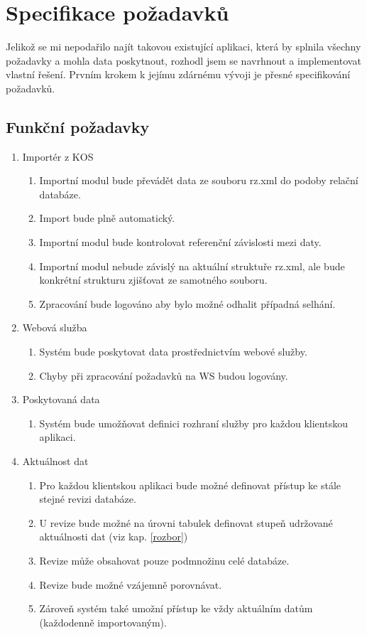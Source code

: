 \documentclass[11pt,twoside,a4paper]{book}
\begin{document}
\section{Specifikace požadavků}
Jelikož se mi nepodařilo najít takovou existující aplikaci, která by splnila všechny požadavky a mohla data poskytnout, rozhodl jsem se navrhnout a implementovat vlastní řešení. Prvním krokem k jejímu zdárnému vývoji je přesné specifikování požadavků.
\subsection{Funkční požadavky}

\begin{enumerate}
\item Importér z KOS
\begin{enumerate}
\item Importní modul bude převádět data ze souboru rz.xml do podoby relační databáze.
\item Import bude plně automatický.
\item Importní modul bude kontrolovat referenční závislosti mezi daty.
\item Importní modul nebude závislý na aktuální struktuře rz.xml, ale bude konkrétní strukturu zjišťovat ze samotného souboru.
\item Zpracování bude logováno aby bylo možné odhalit případná selhání.
\end{enumerate}

\item Webová služba
\begin{enumerate}
\item Systém bude poskytovat data prostřednictvím webové služby.
\item Chyby při zpracování požadavků na WS budou logovány.
\end{enumerate}

\item Poskytovaná data
\begin{enumerate}
\item Systém bude umožňovat definici rozhraní služby pro každou klientskou aplikaci.
\end{enumerate}

\item Aktuálnost dat
\begin{enumerate}
\item Pro každou klientskou aplikaci bude možné definovat přístup ke stále stejné revizi databáze.
\item U revize bude možné na úrovni tabulek definovat stupeň udržované aktuálnosti dat (viz kap. \ref{rozbor})
\item Revize může obsahovat pouze podmnožinu celé databáze.
\item Revize bude možné vzájemně porovnávat.
\item Zároveň systém také umožní přístup ke vždy aktuálním datům (každodenně importovaným).
\end{enumerate}
\end{enumerate}
\end{document}
